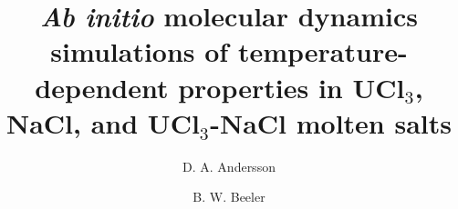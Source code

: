 \documentclass[preprint,3p,10pt,twocolumn,number,sort&compress]{elsarticle}
\begin{document}
\begin{frontmatter}



\title{\textit{Ab initio} molecular dynamics simulations of temperature-dependent properties in UCl$_3$, NaCl, and UCl$_3$-NaCl molten salts}

\author[label1]{D. A. Andersson}
\author[label2,label3]{B. W. Beeler}
\address[label1]{Los Alamos National Laboratory}
\address[label2]{North Carolina State University}
\address[label3]{Idaho National Laboratory}


\end{frontmatter}
\end{document}
